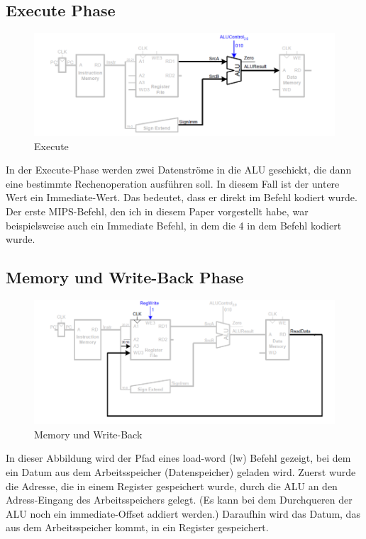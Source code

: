 \documentclass[12pt, a4paper]{article}
\begin{document}
\subsection{Execute Phase}
\begin{figure}[H]
	\begin{center}
		\includegraphics [width=17cm]{Prozessor3.png}
	\end{center}
	\caption{Execute}
\end{figure}

In der Execute-Phase werden zwei Datenströme in die ALU geschickt, die dann eine bestimmte Rechenoperation ausführen soll. In diesem Fall ist der untere Wert ein Immediate-Wert. Das bedeutet, dass er direkt im Befehl kodiert wurde. Der erste MIPS-Befehl, den ich in diesem Paper vorgestellt habe, war beispielsweise auch ein Immediate Befehl, in dem die 4 in dem Befehl kodiert wurde.

\subsection{Memory und Write-Back Phase}
\begin{figure}[H]
	\begin{center}
		\includegraphics [width=17cm]{Prozessor4.png}
	\end{center}
	\caption{Memory und Write-Back}
\end{figure}

In dieser Abbildung wird der Pfad eines load-word (lw) Befehl gezeigt, bei dem ein Datum aus dem Arbeitsspeicher (Datenspeicher) geladen wird. Zuerst wurde die Adresse, die in einem Register gespeichert wurde, durch die ALU an den Adress-Eingang des Arbeitsspeichers gelegt. (Es kann bei dem Durchqueren der ALU noch ein immediate-Offset addiert werden.) Daraufhin wird das Datum, das aus dem Arbeitsspeicher kommt, in ein Register gespeichert.
\end{document}
